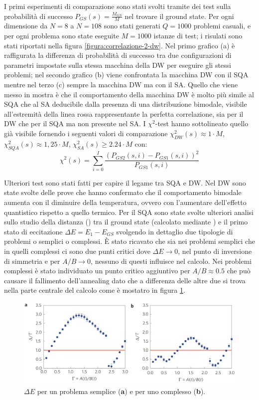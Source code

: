 I primi esperimenti di comparazione sono stati svolti tramite dei test sulla probabilità di successo $P_{GS}(s) = \frac{M_{GS}}{M}$ nel trovare il ground state. Per ogni dimensione da $N=8$ a $N=108$ sono stati generati $Q=1000$ problemi casuali, e per ogni problema sono state eseguite $M=1000$ istanze di test; i risulati sono stati riportati nella figura \ref{figura:correlazione-2-dw}.
Nel primo grafico (a) è raffigurata la differenza di probabilità di successo tra due configurazioni di parametri impostate sulla stessa macchina della DW per eseguire gli stessi problemi; nel secondo grafico (b) viene confrontata la macchina DW con il SQA mentre nel terzo (c) sempre la macchina DW ma con il SA. Quello che viene messo in mostra è che il comportamento della macchina DW è molto più simile al SQA che al SA deducibile dalla presenza di una distribuzione bimodale, visibile all'estremità della linea rossa rappresentante la perfetta correlazione, sia per il DW che per il SQA ma non presente nel SA.
I $\chi^2$-test hanno sottolineato quello già visibile fornendo i seguenti valori di comparazione $\chi_{DW}^2(s) \approx 1 \cdot M$, $\chi_{SQA}^2(s) \approx 1,25 \cdot M$, $\chi_{SA}^2(s) \geq 2.24 \cdot M$ con:
$$\chi^2(s) = \sum_{i=0}^I \frac{(P_{GS2}(s, i) -P_{GS1}(s, i))^2}{P_{GS1}(s, i)}$$

Ulteriori test sono stati fatti per capire il legame tra SQA e DW. Nel DW sono state svolte delle prove che hanno confermato che il comportamento bimodale aumenta con il diminuire della temperatura, ovvero con l'aumentare dell'effetto quantistico rispetto a quello termico. Per il SQA sono state svolte ulteriori analisi sullo studio della distanza () tra il ground state (calcolato mediante \cite{SRVR}) e il primo stato di eccitazione $\Delta E = E_{1} - E_{GS}$ svolgendo in dettaglio due tipologie di problemi o semplici o complessi. È stato ricavato che sia nei problemi semplici che in quelli complessi ci sono due punti critici dove $\Delta E \to 0$, nel punto di inversione di simmetria e per $A/B \to 0$, nessuno di questi influisce nel calcolo. Nei problemi complessi è stato individuato un punto critico aggiuntivo per $A/B \approx 0.5$ che può causare il fallimento dell'annealing dato che a differenza delle altre due si trova nella parte centrale del calcolo come è mostatro in figura \ref{figura:ground-state-gap}.

\begin{figure}[htbp]
  \centering
  \includegraphics[scale=0.38]{Immagini/ground-state-gap.jpg}
  \caption{$\Delta E$ per un problema semplice (\textbf{a}) e per uno complesso (\textbf{b}).}
  \label{figura:ground-state-gap}
\end{figure}

